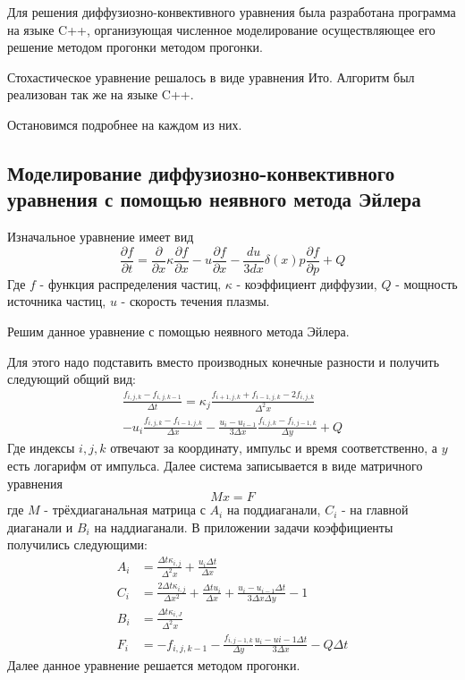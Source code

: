 \documentclass[a4paper,14pt]{extarticle} %
\begin{document}
Для решения диффузиозно-конвективного уравнения была разработана программа на языке C++, организующая численное моделирование осуществляющее его решение методом прогонки методом прогонки.

Стохастическое уравнение решалось в виде уравнения Ито. Алгоритм был реализован так же на языке C++.

Остановимся подробнее на каждом из них.
\subsection{Моделирование диффузиозно-конвективного уравнения с помощью неявного метода Эйлера}
Изначальное уравнение имеет вид \cite{Kang}
\begin{equation}
\frac{\partial f}{\partial t} = \frac{\partial}{\partial x} \kappa \frac{\partial f}{\partial x} - u \frac{\partial f}{\partial x} - \frac{du}{3dx} \delta(x) p \frac{\partial f}{\partial p} +Q
\end{equation}
Где $f$ - функция распределения частиц, $\kappa$ - коэффициент диффузии, $Q$ - мощность источника частиц, $u$ - скорость течения плазмы.

Решим данное уравнение с помощью неявного метода Эйлера.

Для этого надо подставить вместо производных конечные разности и получить следующий общий вид:
\begin{multline}
\frac{f_{i,j,k} - f_{i,j,k-1}}{\Delta t} = \kappa_{j} \frac{f_{i+1,j,k}+f_{i-1,j,k}-2f_{i,j,k}}{\Delta^2 x} \\
- u_i\frac{f_{i,j,k}-f_{i-1,j,k}}{\Delta x}-\frac{u_i-u_{i-1}}{3\Delta x}\frac{f_{i,j,k}-f_{i,j-1,k}}{\Delta y} + Q
\end{multline}
Где индексы $i, j, k$ отвечают за координату, импульс и время соответственно, а $y$ есть логарифм от импульса.
Далее система записывается в виде матричного уравнения
\begin{equation}
Mx=F
\end{equation}
где $M$ - трёхдиаганальная матрица с $A_i$ на поддиаганали, $C_i$ - на главной диаганали и $B_i$ на наддиаганали. В приложении задачи коэффициенты получились следующими:
\begin{eqnarray}
A_i&=\frac{\Delta t \kappa_{i,j}}{\Delta^2 x} + \frac{u_i\Delta t}{\Delta x}\\
C_i&=\frac{2\Delta t \kappa_{i,j}}{\Delta x^2} + \frac{\Delta t u_i}{\Delta x} + \frac{u_i-u_{i-1}\Delta t}{3\Delta x \Delta y} - 1\\
B_i&=\frac{\Delta t \kappa_{i,J}}{\Delta^2 x}\\
F_i&=-f_{i,j,k-1}-\frac{f_{i,j-1,k}}{\Delta y} \frac{u_i-u{i-1}\Delta t}{3\Delta x} - Q\Delta t
\end{eqnarray} 
Далее данное уравнение решается методом прогонки.\cite{progon}
\end{document}

